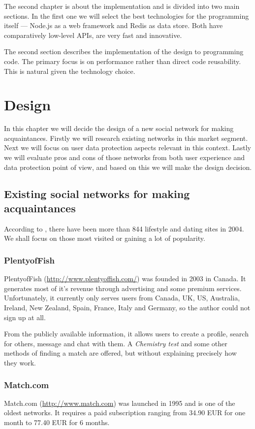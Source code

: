 \documentclass[12pt,oneside]{fithesis}
\begin{document}
	The second chapter is about the implementation and is divided into two main sections. In the first one we will select the best technologies for the programming itself --- Node.js as a web framework and Redis as data store. Both have comparatively low-level APIs, are very fast and innovative.
	
	The second section describes the implementation of the design to programming code. The primary focus is on performance rather than direct code reusability. This is natural given the technology choice. 
\chapter{Design}
	In this chapter we will decide the design of a new social network for making acquaintances. Firstly we will research existing networks in this market segment. Next we will focus on user data protection aspects relevant in this context. Lastly we will evaluate pros and cons of those networks from both user experience and data protection point of view, and  based on this we will make the design decision. 
\section{Existing social networks for making acquaintances}
	According to \cite{wiki:od}, there have been more than 844 lifestyle and dating sites in 2004. We shall focus on those most visited or gaining a lot of popularity.
	\subsection{PlentyofFish}
		PlentyofFish (\url{http://www.plentyoffish.com/}) was founded in 2003 in Canada. It generates most of it's revenue through advertising and some premium services. Unfortunately, it currently only serves users from Canada, UK, US, Australia, Ireland, New Zealand, Spain, France, Italy and Germany, so the author could not sign up at all.
		
		From the publicly available information, it allows users to create a profile, search for others, message and chat with them. A \emph{Chemistry test} and some other methods of finding a match are offered, but without explaining precisely how they work. \cite{website:pof}
		\subsection{Match.com}
		Match.com (\url{http://www.match.com}) was launched in 1995 and is one of the oldest networks. It requires a paid subscription ranging from 34.90 EUR for one month  to 77.40 EUR for 6 months.
		
\end{document}
